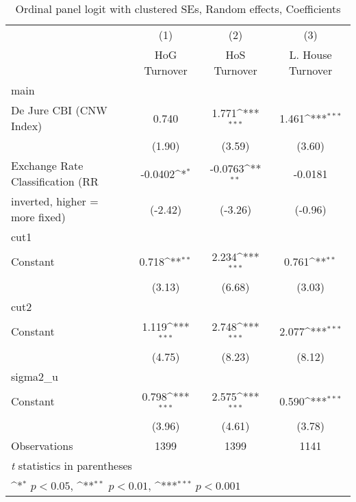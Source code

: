\begin{table}[htbp]\centering
\def\sym#1{\ifmmode^{#1}\else\(^{#1}\)\fi}
\caption{Ordinal panel logit with clustered SEs, Random effects, Coefficients \label{coeffordLogDJ}}
\begin{tabular}{l*{3}{c}}
\toprule
                                        &\multicolumn{1}{c}{(1)}&\multicolumn{1}{c}{(2)}&\multicolumn{1}{c}{(3)}\\
                                        &\multicolumn{1}{c}{HoG Turnover}&\multicolumn{1}{c}{HoS Turnover}&\multicolumn{1}{c}{L. House Turnover}\\
\midrule
main                                    &                  &                  &                  \\
De Jure CBI (CNW Index)                 &    0.740         &    1.771\sym{***}&    1.461\sym{***}\\
                                        &   (1.90)         &   (3.59)         &   (3.60)         \\
\addlinespace
Exchange Rate Classification (RR        &  -0.0402\sym{*}  &  -0.0763\sym{**} &  -0.0181         \\
inverted, higher = more fixed)          &  (-2.42)         &  (-3.26)         &  (-0.96)         \\
\midrule
cut1                                    &                  &                  &                  \\
Constant                                &    0.718\sym{**} &    2.234\sym{***}&    0.761\sym{**} \\
                                        &   (3.13)         &   (6.68)         &   (3.03)         \\
\midrule
cut2                                    &                  &                  &                  \\
Constant                                &    1.119\sym{***}&    2.748\sym{***}&    2.077\sym{***}\\
                                        &   (4.75)         &   (8.23)         &   (8.12)         \\
\midrule
sigma2\_u                                &                  &                  &                  \\
Constant                                &    0.798\sym{***}&    2.575\sym{***}&    0.590\sym{***}\\
                                        &   (3.96)         &   (4.61)         &   (3.78)         \\
\midrule
Observations                            &     1399         &     1399         &     1141         \\
\bottomrule
\multicolumn{4}{l}{\footnotesize \textit{t} statistics in parentheses}\\
\multicolumn{4}{l}{\footnotesize \sym{*} \(p<0.05\), \sym{**} \(p<0.01\), \sym{***} \(p<0.001\)}\\
\end{tabular}
\end{table}

